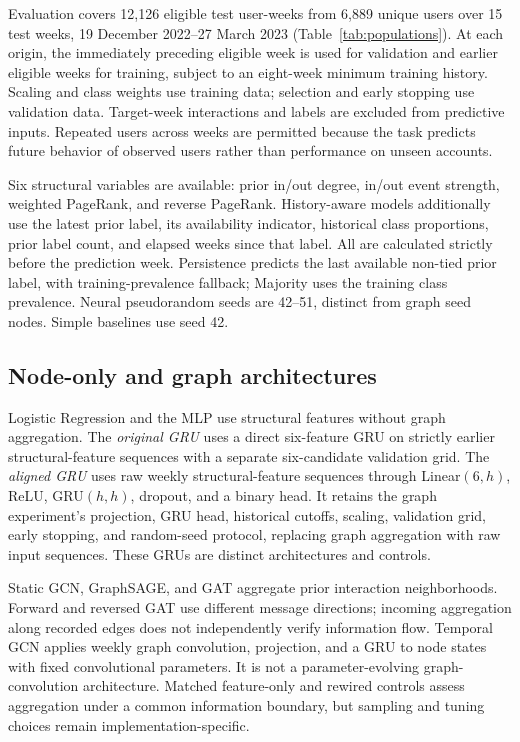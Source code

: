 \documentclass[11pt,a4paper]{article}
\begin{document}
Evaluation covers 12,126 eligible test user-weeks from 6,889 unique users over 15 test weeks, 19 December 2022--27 March 2023 (Table~\ref{tab:populations}). At each origin, the immediately preceding eligible week is used for validation and earlier eligible weeks for training, subject to an eight-week minimum training history. Scaling and class weights use training data; selection and early stopping use validation data. Target-week interactions and labels are excluded from predictive inputs. Repeated users across weeks are permitted because the task predicts future behavior of observed users rather than performance on unseen accounts.

Six structural variables are available: prior in/out degree, in/out event strength, weighted PageRank, and reverse PageRank. History-aware models additionally use the latest prior label, its availability indicator, historical class proportions, prior label count, and elapsed weeks since that label. All are calculated strictly before the prediction week. Persistence predicts the last available non-tied prior label, with training-prevalence fallback; Majority uses the training class prevalence. Neural pseudorandom seeds are 42--51, distinct from graph seed nodes. Simple baselines use seed 42.

\subsection{Node-only and graph architectures}
Logistic Regression and the MLP use structural features without graph aggregation. The \emph{original GRU} uses a direct six-feature GRU on strictly earlier structural-feature sequences with a separate six-candidate validation grid. The \emph{aligned GRU} uses raw weekly structural-feature sequences through Linear$(6,h)$, ReLU, GRU$(h,h)$, dropout, and a binary head. It retains the graph experiment's projection, GRU head, historical cutoffs, scaling, validation grid, early stopping, and random-seed protocol, replacing graph aggregation with raw input sequences. These GRUs are distinct architectures and controls.

Static GCN, GraphSAGE, and GAT aggregate prior interaction neighborhoods. Forward and reversed GAT use different message directions; incoming aggregation along recorded edges does not independently verify information flow. Temporal GCN applies weekly graph convolution, projection, and a GRU to node states with fixed convolutional parameters. It is not a parameter-evolving graph-convolution architecture. Matched feature-only and rewired controls assess aggregation under a common information boundary, but sampling and tuning choices remain implementation-specific.
\end{document}
